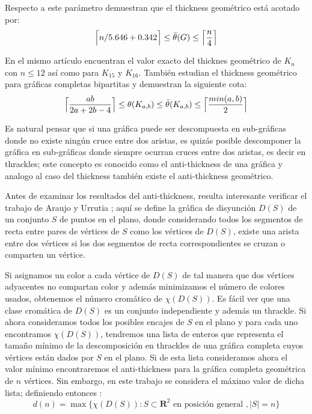 Respecto a este parámetro \cite{Dillencourt2004} demuestran que el thickness
geométrico está acotado por:
\[ \Bigl\lceil n/5.646 + 0.342 \Bigr\rceil \leq  \bar{\theta}(G) \leq \Bigl\lceil\frac{n}{4}\Bigr\rceil \]

En el mismo artículo encuentran el valor exacto del thicknes geométrico
de $K_n$ con $n\leq 12$ así como para $K_{15}$ y $K_{16}$. También
estudian el thickness geométrico para gráficas completas bipartitas y demuestran la
siguiente cota:
\[
  \Bigl\lceil \frac{ab}{2a+2b-4} \Bigr\rceil \leq \theta(K_{a,b}) \leq \bar{\theta}(K_{a,b})
  \leq \Bigl\lceil \frac{min(a,b)}{2} \Bigr\rceil
\]


Es natural pensar que si una gráfica puede ser descompuesta en sub-gráficas donde
no existe ningún cruce entre dos aristas, es quizás posible descomponer la
gráfica en sub-gráficas donde siempre ocurran cruces entre dos aristas, es decir
en thrackles; este concepto es conocido como el anti-thickness de una gráfica y
analogo al caso del thickness también existe el anti-thickness geométrico.

Antes de examinar los resultados del anti-thickness, resulta interesante verificar
el trabajo de Araujo y Urrutia \cite{Araujo2005}; aquí se define la gráfica de
disyunción $D(S)$ de un conjunto $S$ de puntos en el plano, donde considerando
todos los segmentos de recta entre pares de vértices de $S$ como los vértices
de $D(S)$, existe una arista entre dos vértices si los dos segmentos
de recta correspondientes se cruzan o comparten un vértice.

Si asignamos un color a cada vértice de $D(S)$ de tal manera que dos
vértices adyacentes no compartan color y además minimizamos el número de colores
usados, obtenemos el número cromático de $\chi(D(S))$. Es fácil ver que una
clase cromática de $D(S)$ es un conjunto independiente y además un thrackle. Si
ahora consideramos todos los posibles encajes de $S$ en el plano y para cada uno
encontramos $\chi(D(S))$, tendremos una lista de enteros que representa el tamaño
mínimo de la descomposición en thrackles de una gráfica completa cuyos
vértices están dados por $S$ en el plano. Si de esta lista consideramos ahora
el valor mínimo encontraremos el anti-thickness para la gráfica completa geométrica de
$n$ vértices. Sin embargo, en este trabajo se considera el máximo valor de dicha lista;
definiendo entonces :
\[ d(n) = \max\{\chi(D(S)): S \subset \mathbf{R}^2 \text{ en posición general }, |S|=n\}\]

